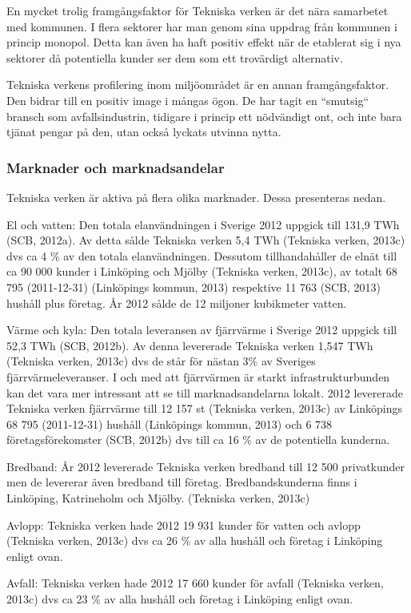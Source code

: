 \documentclass[10pt,a4paper]{article}
\begin{document}
En mycket trolig framgångsfaktor för Tekniska verken är det nära samarbetet med
kommunen. I flera sektorer har man genom sina uppdrag från kommunen i princip
monopol. Detta kan även ha haft positiv effekt när de etablerat sig i nya
sektorer då potentiella kunder ser dem som ett trovärdigt alternativ. 

Tekniska verkens profilering inom miljöområdet är en annan framgångsfaktor. Den
bidrar till en positiv image i mångas ögon. De har tagit en ``smutsig`` bransch
som avfallsindustrin, tidigare i princip ett nödvändigt ont, och inte bara tjänat 
pengar på den, utan också lyckats utvinna nytta.

\subsubsection{Marknader och marknadsandelar}
Tekniska verken är aktiva på flera olika marknader. Dessa presenteras nedan.

El och vatten: Den totala elanvändningen i Sverige 2012 uppgick till 131,9 TWh (SCB, 2012a). Av detta sålde Tekniska verken 5,4 TWh (Tekniska verken, 2013c) dvs ca 4 \% av den totala elanvändningen. Dessutom tillhandahåller de elnät  till ca 90 000 kunder i Linköping och Mjölby (Tekniska verken, 2013c), av totalt 68 795 (2011-12-31) (Linköpings kommun, 2013) respektive 11 763 (SCB, 2013) hushåll plus företag. År 2012 sålde de 12 miljoner kubikmeter vatten. 

Värme och kyla: Den totala leveransen av fjärrvärme i Sverige 2012 uppgick till 52,3 TWh (SCB, 2012b). Av denna levererade Tekniska verken 1,547 TWh (Tekniska verken, 2013c) dvs de står för nästan 3\% av Sveriges fjärrvärmeleveranser. I och med att fjärrvärmen är starkt infrastrukturbunden kan det vara mer intressant att se till marknadsandelarna lokalt. 2012 levererade Tekniska verken fjärrvärme till 12 157 st (Tekniska verken, 2013c) av Linköpings 68 795 (2011-12-31) hushåll (Linköpings kommun, 2013) och 6 738 företagsförekomster (SCB, 2012b) dvs till ca 16 \% av de potentiella kunderna.

Bredband: År 2012 levererade Tekniska verken bredband till 12 500 privatkunder men de levererar även bredband till företag. Bredbandskunderna finns i  Linköping, Katrineholm och Mjölby. (Tekniska verken, 2013c)

Avlopp: Tekniska verken hade 2012 19 931 kunder för vatten och avlopp (Tekniska verken, 2013c) dvs ca 26 \% av alla hushåll och företag i Linköping enligt ovan. 

Avfall: Tekniska verken hade 2012 17 660 kunder för avfall (Tekniska verken, 2013c) dvs ca 23 \% av alla hushåll och företag i Linköping enligt ovan. 
\end{document}
